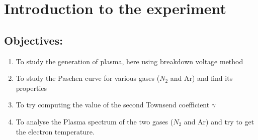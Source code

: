 \documentclass[]{report}[12 pt]
\begin{document}
	
	\tableofcontents
\chapter{Introduction to the experiment}
	\section*{Objectives:}
\begin{enumerate}
	\item To study the generation of plasma, here using breakdown voltage method
	\item To study the Paschen curve for various gases ($N_2$ and Ar) and find its properties
	\item To try computing the value of the second Townsend coefficient $\gamma$
	\item To analyse the Plasma spectrum of the two gases ($N_2$ and Ar) and try to get the electron temperature.
\end{enumerate}
\end{document}
